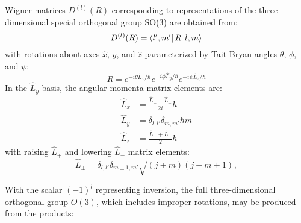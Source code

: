 \documentclass[twocolumn,showpacs,preprintnumbers,superscriptaddress,prb,floatfix,aps,10pt]{revtex4-1}
\begin{document}
Wigner matrices $D^{(l)}(R)$ corresponding to representations of the three-dimensional special orthogonal group SO(3) are obtained from:\cite{martin_electronic_2004}
\begin{equation}
\label{eq:imselfenergy}
D^{(l)}(R) = \bra{l',m'} R \ket{l,m}
\end{equation}
with rotations about axes $\hat{x}$, $\hat{y}$, and $\hat{z}$ parameterized by Tait Bryan angles $\theta$, $\phi$, and $\psi$:
\begin{equation}
R = e^{-i\theta\hat{L}_x/\hbar} e^{-i\phi\hat{L}_y/\hbar} e^{-i\psi\hat{L}_z/\hbar}
\end{equation}
%
In the $\hat{L}_y$ basis, the angular momenta matrix elements are:\cite{shankar_fundamentals_2014}
\begin{align}
\label{eq:angular_momenta}
\hat{L}_x & = \frac{\hat{L}_{+}-\hat{L}_{-}}{2i} \hbar \\
\hat{L}_y & = \delta_{l,l'}\delta_{m,m'} \hbar m \\
\hat{L}_z & = \frac{\hat{L}_{+}+\hat{L}_{-}}{2} \hbar
\end{align}
with raising $\hat{L}_+$ and lowering $\hat{L}_-$ matrix elements:
\begin{equation}
\label{eq:raising_lowering_operator}
\hat{L}_{\pm} = \delta_{l,l'}\delta_{m\pm1,m'} \sqrt{(j\mp m)(j\pm m+1)} ,
\end{equation}

With the scalar $(-1)^l$ representing inversion, the full three-dimensional orthogonal group $O(3)$, which includes improper rotations, may be produced from the products:
\end{document}
